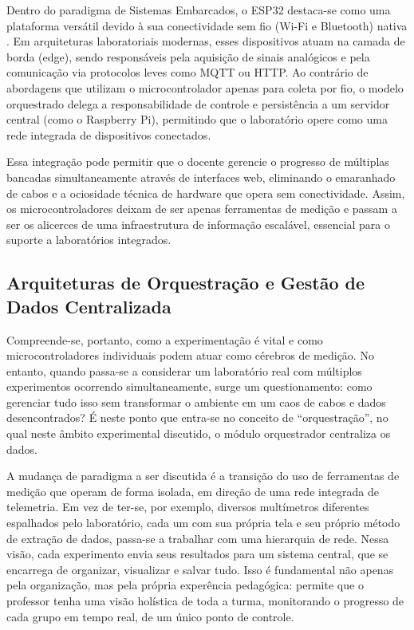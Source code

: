 Dentro do paradigma de Sistemas Embarcados, o ESP32 destaca-se como uma plataforma versátil devido à sua conectividade sem fio (Wi-Fi e Bluetooth) nativa \cite{esp32}. Em arquiteturas laboratoriais modernas, esses dispositivos atuam na camada de borda (edge), sendo responsáveis pela aquisição de sinais analógicos e pela comunicação via protocolos leves como MQTT ou HTTP. Ao contrário de abordagens que utilizam o microcontrolador apenas para coleta por fio, o modelo orquestrado delega a responsabilidade de controle e persistência a um servidor central (como o Raspberry Pi), permitindo que o laboratório opere como uma rede integrada de dispositivos conectados.

Essa integração pode permitir que o docente gerencie o progresso de múltiplas bancadas simultaneamente através de interfaces web, eliminando o emaranhado de cabos e a ociosidade técnica de hardware que opera sem conectividade. Assim, os microcontroladores deixam de ser apenas ferramentas de medição e passam a ser os alicerces de uma infraestrutura de informação escalável, essencial para o suporte a laboratórios integrados.

\subsection{Arquiteturas de Orquestração e Gestão de Dados Centralizada}
Compreende-se, portanto, como a experimentação é vital e como microcontroladores individuais podem atuar como cérebros de medição. No entanto, quando passa-se a considerar um laboratório real com múltiplos experimentos ocorrendo simultaneamente, surge um questionamento: como gerenciar tudo isso sem transformar o ambiente em um caos de cabos e dados desencontrados? É neste ponto que entra-se no conceito de ``orquestração'', no qual neste âmbito experimental discutido, o módulo orquestrador centraliza os dados.

A mudança de paradigma a ser discutida é a transição do uso de ferramentas de medição que operam de forma isolada, em direção de uma rede integrada de telemetria. Em vez de ter-se, por exemplo, diversos multímetros diferentes espalhados pelo laboratório, cada um com sua própria tela e seu próprio método de extração de dados, passa-se a trabalhar com uma hierarquia de rede. Nessa visão, cada experimento envia seus resultados para um sistema central, que se encarrega de organizar, visualizar e salvar tudo. Isso é fundamental não apenas pela organização, mas pela própria experência pedagógica: permite que o professor tenha uma visão holística de toda a turma, monitorando o progresso de cada grupo em tempo real, de um único ponto de controle.

